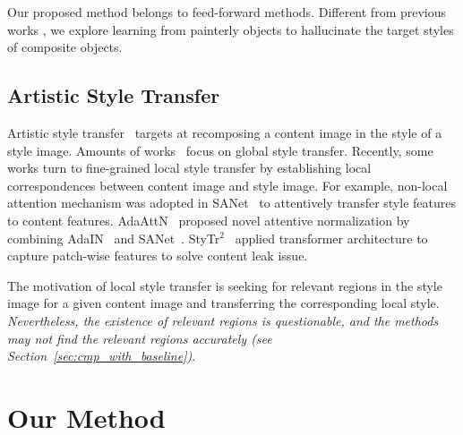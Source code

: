 \documentclass[letterpaper]{article} %
\begin{document}
Our proposed method belongs to feed-forward methods. Different from previous works \cite{peng2019element,yan2022style,cao2022painterly}, we explore learning from painterly objects to hallucinate the target styles of composite objects.


\subsection{Artistic Style Transfer}
Artistic style transfer~\cite{kolkin2019style,jing2020dynamic,chen2021dualast,chen2017stylebank,sanakoyeu2018style,wang2020collaborative,li2018learning,chen2016fast,sheng2018avatar,gu2018arbitrary,zhang2019multimodal,chen2022toward,huo2021manifold} targets at recomposing a content image in the style of a style image. Amounts of works~\cite{huang2017arbitrary,li2017universal} focus on global style transfer.
Recently, some works \cite{park2019arbitrary,liu2021adaattn,deng2022stytr2} turn to fine-grained local style transfer by establishing local correspondences between content image and style image.
For example, non-local attention mechanism was adopted in SANet~\cite{park2019arbitrary} to attentively transfer style features to content features. AdaAttN~\cite{liu2021adaattn} proposed  novel attentive normalization  by combining AdaIN~\cite{huang2017arbitrary} and SANet~\cite{park2019arbitrary}.  StyTr$^2$~\cite{deng2022stytr2} applied transformer architecture to capture patch-wise features to solve content leak issue.

The motivation of local style transfer \cite{elad2017style,li2016combining,park2019arbitrary,huo2021manifold} is seeking for relevant regions in the style image for a given content image and transferring the corresponding local style. \emph{Nevertheless, the existence of relevant regions is questionable, and the methods may not find the relevant regions accurately (see Section~\ref{sec:cmp_with_baseline})}.


\section{Our Method}
\end{document}
